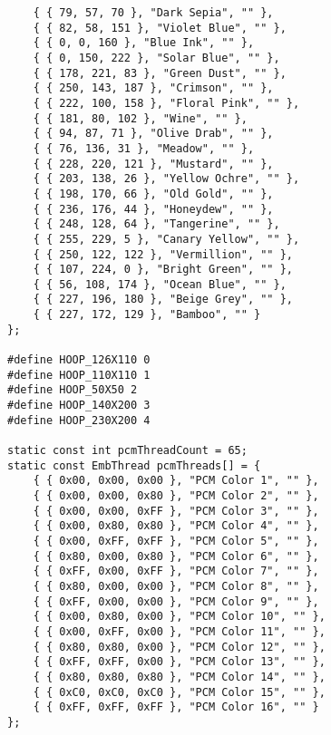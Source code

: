 \documentclass[onesize, a4paper]{refart}
\begin{document}
\begin{verbatim}
    { { 79, 57, 70 }, "Dark Sepia", "" },
    { { 82, 58, 151 }, "Violet Blue", "" },
    { { 0, 0, 160 }, "Blue Ink", "" },
    { { 0, 150, 222 }, "Solar Blue", "" },
    { { 178, 221, 83 }, "Green Dust", "" },
    { { 250, 143, 187 }, "Crimson", "" },
    { { 222, 100, 158 }, "Floral Pink", "" },
    { { 181, 80, 102 }, "Wine", "" },
    { { 94, 87, 71 }, "Olive Drab", "" },
    { { 76, 136, 31 }, "Meadow", "" },
    { { 228, 220, 121 }, "Mustard", "" },
    { { 203, 138, 26 }, "Yellow Ochre", "" },
    { { 198, 170, 66 }, "Old Gold", "" },
    { { 236, 176, 44 }, "Honeydew", "" },
    { { 248, 128, 64 }, "Tangerine", "" },
    { { 255, 229, 5 }, "Canary Yellow", "" },
    { { 250, 122, 122 }, "Vermillion", "" },
    { { 107, 224, 0 }, "Bright Green", "" },
    { { 56, 108, 174 }, "Ocean Blue", "" },
    { { 227, 196, 180 }, "Beige Grey", "" },
    { { 227, 172, 129 }, "Bamboo", "" }
};

#define HOOP_126X110 0
#define HOOP_110X110 1
#define HOOP_50X50 2
#define HOOP_140X200 3
#define HOOP_230X200 4

static const int pcmThreadCount = 65;
static const EmbThread pcmThreads[] = {
    { { 0x00, 0x00, 0x00 }, "PCM Color 1", "" },
    { { 0x00, 0x00, 0x80 }, "PCM Color 2", "" },
    { { 0x00, 0x00, 0xFF }, "PCM Color 3", "" },
    { { 0x00, 0x80, 0x80 }, "PCM Color 4", "" },
    { { 0x00, 0xFF, 0xFF }, "PCM Color 5", "" },
    { { 0x80, 0x00, 0x80 }, "PCM Color 6", "" },
    { { 0xFF, 0x00, 0xFF }, "PCM Color 7", "" },
    { { 0x80, 0x00, 0x00 }, "PCM Color 8", "" },
    { { 0xFF, 0x00, 0x00 }, "PCM Color 9", "" },
    { { 0x00, 0x80, 0x00 }, "PCM Color 10", "" },
    { { 0x00, 0xFF, 0x00 }, "PCM Color 11", "" },
    { { 0x80, 0x80, 0x00 }, "PCM Color 12", "" },
    { { 0xFF, 0xFF, 0x00 }, "PCM Color 13", "" },
    { { 0x80, 0x80, 0x80 }, "PCM Color 14", "" },
    { { 0xC0, 0xC0, 0xC0 }, "PCM Color 15", "" },
    { { 0xFF, 0xFF, 0xFF }, "PCM Color 16", "" }
};



\end{verbatim}
\end{document}
